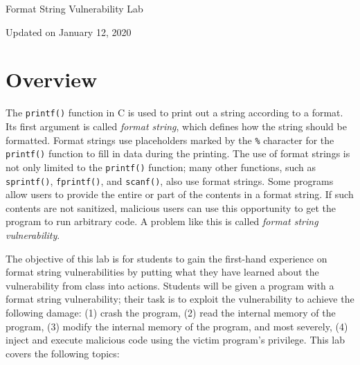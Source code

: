 
\newcommand{\commonfolder}{../../common-files}





\newcommand{\formatFigs}{./Figs}






\begin{center}
{\LARGE Format String Vulnerability Lab}

\vspace{0.05in}
Updated on January 12, 2020
\end{center}




\section{Overview}


The \texttt{printf()} function in C is used to print out a string according to a format.  Its
first argument is called \textit{format string}, which defines how the string should be
formatted. Format strings use placeholders marked by the \texttt{\%} character for the
\texttt{printf()} function to fill in data during the printing.  The use of format strings is
not only limited to the \texttt{printf()} function; many other functions, such as
\texttt{sprintf()}, \texttt{fprintf()}, and \texttt{scanf()}, also use format strings. Some
programs allow users to provide the entire or part of the contents in a format string. If such
contents are not sanitized, malicious users can use this opportunity to get the program to run
arbitrary code. A problem like this is called \textit{format string vulnerability}.


The objective of this lab is for students to gain the first-hand
experience on format string vulnerabilities by putting what they have learned 
about the vulnerability from class into actions. 
Students will be given a program with a format string
vulnerability; their task is to exploit
the vulnerability to achieve the following damage: (1) crash the 
program, (2) read the internal memory of the program, (3) modify
the internal memory of the program, and most severely, 
(4) inject and execute malicious code using the victim program's privilege. 
This lab covers the following topics:

